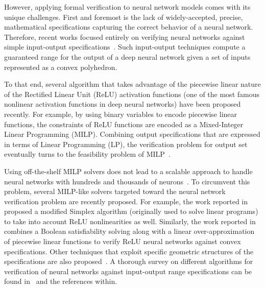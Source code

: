 However, applying formal verification to neural network models comes with its unique challenges. First and foremost is the lack of widely-accepted, precise, mathematical specifications capturing the correct behavior of a neural network. Therefore, recent works focused entirely on verifying neural networks against simple input-output specifications~\cite{katz2017reluplex,ehlers2017formal,bunel2018unified,ruan2018reachability,dutta2017output,pulina2010abstraction}. Such input-output techniques compute a guaranteed range for the output of a deep neural network given a set of inputs represented as a convex polyhedron.  

To that end, several algorithm that takes advantage of the piecewise linear nature of the Rectified Linear Unit (ReLU) activation functions (one of the most famous nonlinear activation functions in deep neural networks) have been proposed recently. For example, by using binary variables to encode piecewise linear functions, the constraints of ReLU functions are encoded as a Mixed-Integer Linear Programming (MILP). Combining output specifications that are expressed in terms of Linear Programming (LP), the verification problem for output set eventually turns to the feasibility problem of MILP~\cite{dutta2018output,tjeng2017verifying}. 

Using off-the-shelf MILP solvers does not lead to a scalable approach to handle neural networks with hundreds and thousands of neurons~\cite{ehlers2017formal}. To circumvent this problem, several MILP-like solvers targeted toward the neural network verification problem are recently proposed. For example, the work reported in~\cite{katz2017reluplex} proposed a modified Simplex algorithm (originally used to solve linear programs) to take into account ReLU nonlinearities as well. Similarly, the work reported in~\cite{ehlers2017formal} combines a Boolean satisfiability solving along with a linear over-approximation of piecewise linear functions to verify ReLU neural networks against convex specifications. Other techniques that exploit specific geometric structures of the specifications are also proposed~\cite{gehr2018ai,xiang2017reachable}. A thorough survey on different algorithms for verification of neural networks against input-output range specifications can be found in~\cite{xiang2017survey} and the references within.



